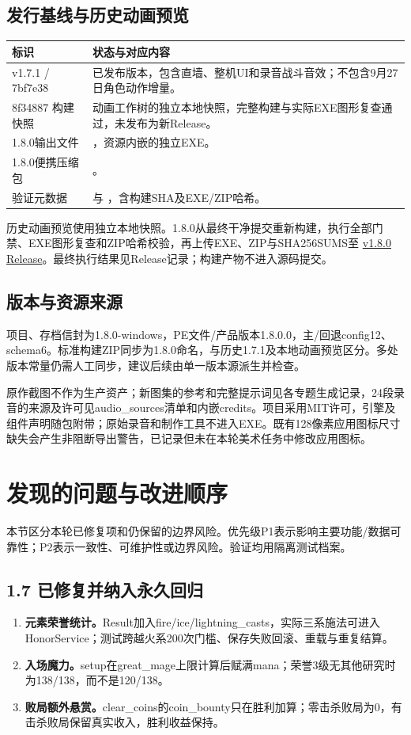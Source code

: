 \documentclass[UTF8,a4paper,11pt,fontset=windows]{ctexart}
\newcommand{\nextsection}[1]{\par\bigskip\section{#1}}
\begin{document}
\subsection{发行基线与历史动画预览}
\begin{tabularx}{\linewidth}{@{}P{35mm}Y@{}}
\toprule
标识 & 状态与对应内容\\\midrule
v1.7.1 / 7bf7e38 & 已发布版本，包含直墙、整机UI和录音战斗音效；不包含9月27日角色动作增量。\\
8f34887 构建快照 & 动画工作树的独立本地快照，完整构建与实际EXE图形复查通过，未发布为新Release。\\
1.8.0输出文件 & ，资源内嵌的独立EXE。\\
1.8.0便携压缩包 & 。\\
验证元数据 &  与 ，含构建SHA及EXE/ZIP哈希。\\
\bottomrule
\end{tabularx}

历史动画预览使用独立本地快照。1.8.0从最终干净提交重新构建，执行全部门禁、EXE图形复查和ZIP哈希校验，再上传EXE、ZIP与SHA256SUMS至 \href{https://github.com/bei-li16/DefenderGame/releases/tag/v1.8.0}{v1.8.0 Release}。最终执行结果见Release记录；构建产物不进入源码提交。

\subsection{版本与资源来源}
项目、存档信封为1.8.0-windows，PE文件/产品版本1.8.0.0，主/回退config12、schema6。标准构建ZIP同步为1.8.0命名，与历史1.7.1及本地动画预览区分。多处版本常量仍需人工同步，建议后续由单一版本源派生并检查。

原作截图不作为生产资产；新图集的参考和完整提示词见各专题生成记录，24段录音的来源及许可见audio\_sources清单和内嵌credits。项目采用MIT许可，引擎及组件声明随包附带；原始录音和制作工具不进入EXE。既有128像素应用图标尺寸缺失会产生非阻断导出警告，已记录但未在本轮美术任务中修改应用图标。

\nextsection{发现的问题与改进顺序}
\label{sec:risks}
本节区分本轮已修复项和仍保留的边界风险。优先级P1表示影响主要功能/数据可靠性；P2表示一致性、可维护性或边界风险。验证均用隔离测试档案。

\subsection{1.7 已修复并纳入永久回归}
\begin{enumerate}
\item \textbf{元素荣誉统计。}Result加入fire/ice/lightning\_casts，实际三系施法可进入HonorService；测试跨越火系200次门槛、保存失败回滚、重载与重复结算。
\item \textbf{入场魔力。}setup在great\_mage上限计算后赋满mana；荣誉3级无其他研究时为138/138，而不是120/138。
\item \textbf{败局额外悬赏。}clear\_coins的coin\_bounty只在胜利加算；零击杀败局为0，有击杀败局保留真实收入，胜利收益保持。
\end{enumerate}
\end{document}
